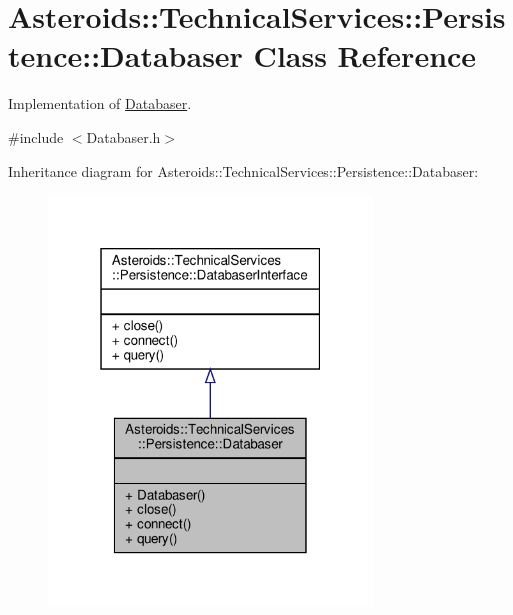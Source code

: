 \hypertarget{classAsteroids_1_1TechnicalServices_1_1Persistence_1_1Databaser}{}\section{Asteroids\+:\+:Technical\+Services\+:\+:Persistence\+:\+:Databaser Class Reference}
\label{classAsteroids_1_1TechnicalServices_1_1Persistence_1_1Databaser}


Implementation of \hyperlink{classAsteroids_1_1TechnicalServices_1_1Persistence_1_1Databaser}{Databaser}.  




{\ttfamily \#include $<$Databaser.\+h$>$}



Inheritance diagram for Asteroids\+:\+:Technical\+Services\+:\+:Persistence\+:\+:Databaser\+:\nopagebreak
\begin{figure}[H]
\begin{center}
\leavevmode
\includegraphics[width=244pt]{classAsteroids_1_1TechnicalServices_1_1Persistence_1_1Databaser__inherit__graph}
\end{center}
\end{figure}


